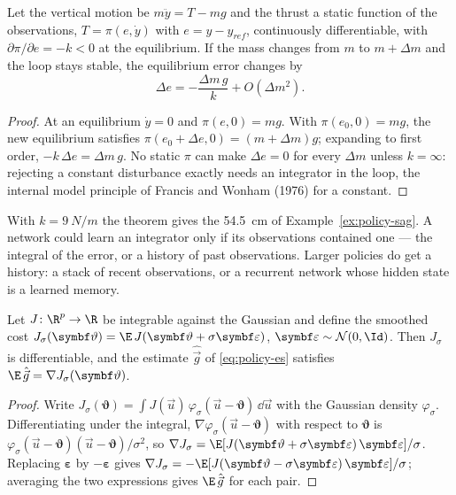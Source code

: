 \begin{theorem}
\label{thm:policy-offset}
Let the vertical motion be $m\ddot y = T - mg$ and the thrust a static function of the observations, $T = \pi(e, \dot y)$ with $e = y - y_{ref}$, continuously differentiable, with $\partial\pi/\partial e = -k < 0$ at the equilibrium. If the mass changes from $m$ to $m + \Delta m$ and the loop stays stable, the equilibrium error changes by
\begin{equation}\label{eq:policy-offset}
  \Delta e = -\frac{\Delta m\,g}{k} + O(\Delta m^2) .
\end{equation}
\end{theorem}
\begin{proof}
At an equilibrium $\dot y = 0$ and $\pi(e, 0) = mg$. With $\pi(e_0, 0) = mg$, the new equilibrium satisfies $\pi(e_0 + \Delta e, 0) = (m + \Delta m)g$; expanding to first order, $-k\,\Delta e = \Delta m\,g$. No static $\pi$ can make $\Delta e = 0$ for every $\Delta m$ unless $k = \infty$: rejecting a constant disturbance exactly needs an integrator in the loop, the internal model principle of Francis and Wonham (1976) for a constant.
\end{proof}

With $k = \SI{9}{N/m}$ the theorem gives the \SI{54.5}{cm} of Example~\ref{ex:policy-sag}. A network could learn an integrator only if its observations contained one — the integral of the error, or a history of past observations. Larger policies do get a history: a stack of recent observations, or a recurrent network whose hidden state is a learned memory.

\begin{theorem}
\label{thm:policy-es}
Let $J\colon\R^p \to \R$ be integrable against the Gaussian and define the smoothed cost $J_\sigma(\symbf\vartheta) = \E\,J(\symbf\vartheta + \sigma\symbf\varepsilon)$, $\symbf\varepsilon \sim \mathcal N(0, \Id)$. Then $J_\sigma$ is differentiable, and the estimate $\hat{\vec g}$ of \cref{eq:policy-es} satisfies $\E\,\hat{\vec g} = \nabla J_\sigma(\symbf\vartheta)$.
\end{theorem}
\begin{proof}
Write $J_\sigma(\symbf\vartheta) = \int J(\vec u)\,\varphi_\sigma(\vec u - \symbf\vartheta)\,\dd\vec u$ with the Gaussian density $\varphi_\sigma$. Differentiating under the integral, $\nabla\varphi_\sigma(\vec u - \symbf\vartheta)$ with respect to $\symbf\vartheta$ is $\varphi_\sigma(\vec u - \symbf\vartheta)(\vec u - \symbf\vartheta)/\sigma^2$, so $\nabla J_\sigma = \E[J(\symbf\vartheta + \sigma\symbf\varepsilon)\,\symbf\varepsilon]/\sigma$. Replacing $\symbf\varepsilon$ by $-\symbf\varepsilon$ gives $\nabla J_\sigma = -\E[J(\symbf\vartheta - \sigma\symbf\varepsilon)\,\symbf\varepsilon]/\sigma$; averaging the two expressions gives $\E\,\hat{\vec g}$ for each pair.
\end{proof}

